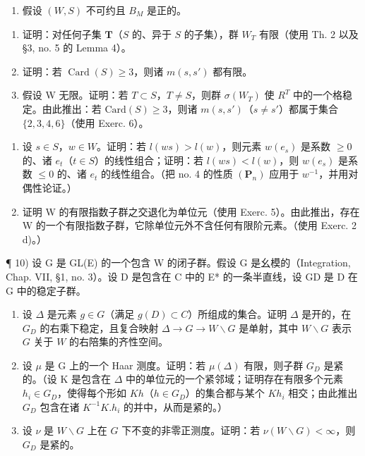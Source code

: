 \begin{enumerate}
\def\labelenumi{\arabic{enumi})}
\setcounter{enumi}{6}
\tightlist
\item
  假设 \((W, S)\) 不可约且 \(B_{M}\) 是正的。
\end{enumerate}

\begin{enumerate}
\def\labelenumi{\alph{enumi})}
\item
  证明：对任何子集 \(\mathbf{T}\)（\(S\) 的、异于 \(S\) 的子集），群 \(W_{T}\) 有限（使用 Th. 2 以及 §3, no. 5 的 Lemma 4）。
\item
  证明：若 \(\operatorname{Card}(S) \geqslant 3\)，则诸 \(m(s, s')\) 都有限。
\item
  假设 W 无限。证明：若 \(T \subset S\)，\(T \neq S\)，则群 \(\sigma(W_{T})\) 使 \(R^{T}\) 中的一个格稳定。由此推出：若 \(\text{Card}(S) \geqslant 3\)，则诸 \(m(s, s')\)（\(s \neq s'\)）都属于集合 \(\{2, 3, 4, 6\}\)（使用 Exerc. 6）。
\end{enumerate}

\begin{enumerate}
\def\labelenumi{\arabic{enumi})}
\setcounter{enumi}{7}
\item
  设 \(s \in S\)，\(w \in W\)。证明：若 \(l(ws) > l(w)\)，则元素 \(w(e_s)\) 是系数 \(\geqslant 0\) 的、诸 \(e_t\)（\(t \in S\)）的线性组合；证明：若 \(l(ws) < l(w)\)，则 \(w(e_s)\) 是系数 \(\leqslant 0\) 的、诸 \(e_t\) 的线性组合。（把 no. 4 的性质 \((\mathbf{P}_n)\) 应用于 \(w^{-1}\)，并用对偶性论证。）
\item
  证明 W 的有限指数子群之交退化为单位元（使用 Exerc. 5）。由此推出，存在 W 的一个有限指数子群，它除单位元外不含任何有限阶元素。（使用 Exerc. 2 d)。）
\end{enumerate}

¶ 10) 设 G 是 GL(E) 的一个包含 W 的闭子群。假设 G 是幺模的（Integration, Chap. VII, §1, no. 3）。设 D 是包含在 C 中的 E* 的一条半直线，设 GD 是 D 在 G 中的稳定子群。

\begin{enumerate}
\def\labelenumi{\alph{enumi})}
\item
  设 \(\Delta\) 是元素 \(g \in G\)（满足 \(g(D) \subset C\)）所组成的集合。证明 \(\Delta\) 是开的，在 \(G_D\) 的右乘下稳定，且复合映射 \(\Delta \to G \to W \backslash G\) 是单射，其中 \(W \backslash G\) 表示 \(G\) 关于 \(W\) 的右陪集的齐性空间。
\item
  设 \(\mu\) 是 G 上的一个 Haar 测度。证明：若 \(\mu(\Delta)\) 有限，则子群 \(G_{D}\) 是紧的。（设 K 是包含在 \(\Delta\) 中的单位元的一个紧邻域；证明存在有限多个元素 \(h_i \in G_D\)，使得每个形如 \(Kh\)（\(h \in G_D\)）的集合都与某个 \(Kh_i\) 相交；由此推出 \(G_D\) 包含在诸 \(K^{-1}K.h_i\) 的并中，从而是紧的。）
\item
  设 \(\nu\) 是 \(W\backslash G\) 上在 \(G\) 下不变的非零正测度。证明：若 \(\nu(W\backslash G) < \infty\)，则 \(G_{D}\) 是紧的。
\end{enumerate}

